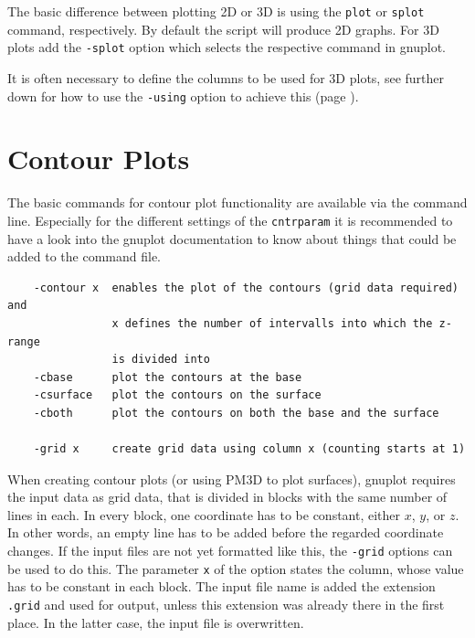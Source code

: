 \documentclass[12pt, a4paper]{article}
\begin{document}
The basic difference between plotting 2D or 3D is using the \verb'plot' or \verb'splot' command, respectively. By default the script will produce 2D graphs. For 3D plots add the \verb'-splot' option which selects the respective command in gnuplot.

It is often necessary to define the columns to be used for 3D plots, see further down for how to use the \verb'-using' option to achieve this (page \pageref{Sec:Using}).





\section{Contour Plots}

The basic commands for contour plot functionality are available via the command line. Especially for the different settings of the \verb'cntrparam' it is recommended to have a look into the gnuplot documentation to know about things that could be added to the command file.

\begin{verbatim}
    -contour x  enables the plot of the contours (grid data required) and
                x defines the number of intervalls into which the z-range
                is divided into
    -cbase      plot the contours at the base
    -csurface   plot the contours on the surface
    -cboth      plot the contours on both the base and the surface

    -grid x     create grid data using column x (counting starts at 1)
\end{verbatim}

When creating contour plots (or using PM3D to plot surfaces), gnuplot requires the input data as grid data, that is divided in blocks with the same number of lines in each. In every block, one coordinate has to be constant, either $x$, $y$, or $z$. In other words, an empty line has to be added before the regarded coordinate changes. If the input files are not yet formatted like this, the \verb'-grid' options can be used to do this. The parameter \verb'x' of the option states the column, whose value has to be constant in each block. The input file name is added the extension \verb'.grid' and used for output, unless this extension was already there in the first place. In the latter case, the input file is overwritten.
\end{document}
